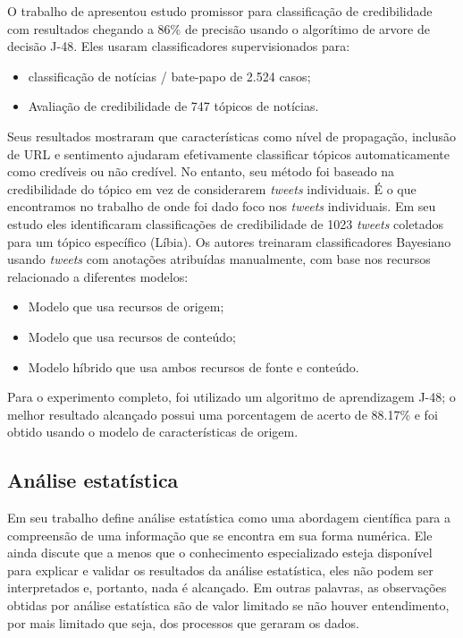 O trabalho de \cite{castillo_information_2011} apresentou estudo promissor para classificação de credibilidade com resultados chegando a 86\% de precisão usando o algorítimo de arvore de decisão J-48. Eles usaram classificadores supervisionados para: 
\begin{itemize}
    \item classificação de notícias / bate-papo de 2.524 casos;
    \item Avaliação de credibilidade de 747 tópicos de notícias.
\end{itemize}
Seus resultados mostraram que características como nível de propagação, inclusão de URL e sentimento ajudaram efetivamente classificar tópicos automaticamente como credíveis ou não credível. No entanto, seu método foi baseado na credibilidade do tópico em vez de considerarem \emph{tweets} individuais. É o que encontramos no trabalho de \cite{kang_modeling_2012} onde foi dado foco nos \emph{tweets} individuais. Em seu estudo eles identificaram classificações de credibilidade de 1023 \emph{tweets} coletados para um tópico específico (Líbia). Os autores treinaram classificadores Bayesiano usando \emph{tweets} com anotações atribuídas manualmente, com base nos recursos relacionado a diferentes modelos: 

\begin{itemize}
    \item Modelo que usa recursos de origem;
    \item Modelo que usa recursos de conteúdo;
    \item Modelo híbrido que usa ambos recursos de fonte e conteúdo.
\end{itemize}

Para o experimento completo, foi utilizado um algoritmo de aprendizagem J-48; o melhor resultado alcançado possui uma porcentagem de acerto de 88.17\% e foi obtido usando o modelo de características de origem.


\subsection{Análise estatística}

Em seu trabalho \cite{nott12977} define análise estatística como uma abordagem científica para a compreensão de uma informação que se encontra em sua forma numérica. Ele ainda discute que a menos que o conhecimento especializado esteja disponível para explicar e validar os resultados da análise estatística, eles não podem ser interpretados e, portanto, nada é alcançado. Em outras palavras, as observações obtidas por análise estatística são de valor limitado se não houver entendimento, por mais limitado que seja, dos processos que geraram os dados.

